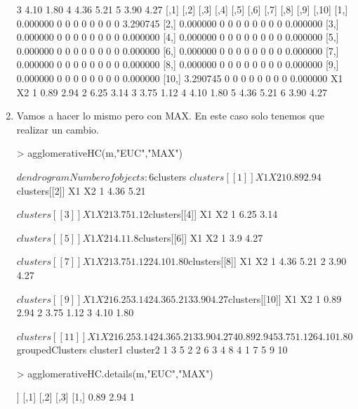 \documentclass[parskip=full]{scrartcl}
\begin{document}
\begin{enumerate}
\begin{Schunk}
\begin{Soutput}
3 4.10 1.80
4 4.36 5.21
5 3.90 4.27
          [,1] [,2] [,3] [,4] [,5] [,6] [,7] [,8] [,9]    [,10]
 [1,] 0.000000    0    0    0    0    0    0    0    0 3.290745
 [2,] 0.000000    0    0    0    0    0    0    0    0 0.000000
 [3,] 0.000000    0    0    0    0    0    0    0    0 0.000000
 [4,] 0.000000    0    0    0    0    0    0    0    0 0.000000
 [5,] 0.000000    0    0    0    0    0    0    0    0 0.000000
 [6,] 0.000000    0    0    0    0    0    0    0    0 0.000000
 [7,] 0.000000    0    0    0    0    0    0    0    0 0.000000
 [8,] 0.000000    0    0    0    0    0    0    0    0 0.000000
 [9,] 0.000000    0    0    0    0    0    0    0    0 0.000000
[10,] 3.290745    0    0    0    0    0    0    0    0 0.000000
    X1   X2
1 0.89 2.94
2 6.25 3.14
3 3.75 1.12
4 4.10 1.80
5 4.36 5.21
6 3.90 4.27
\end{Soutput}
\end{Schunk}


    \item Vamos a hacer lo mismo pero con MAX. En este caso solo tenemos que realizar un cambio.


\begin{Schunk}
\begin{Sinput}
> agglomerativeHC(m,"EUC","MAX")
\end{Sinput}
\begin{Soutput}
$dendrogram
Number of objects: 6 


$clusters
$clusters[[1]]
    X1   X2
1 0.89 2.94

$clusters[[2]]
    X1   X2
1 4.36 5.21

$clusters[[3]]
    X1   X2
1 3.75 1.12

$clusters[[4]]
    X1   X2
1 6.25 3.14

$clusters[[5]]
   X1  X2
1 4.1 1.8

$clusters[[6]]
   X1   X2
1 3.9 4.27

$clusters[[7]]
    X1   X2
1 3.75 1.12
2 4.10 1.80

$clusters[[8]]
    X1   X2
1 4.36 5.21
2 3.90 4.27

$clusters[[9]]
    X1   X2
1 6.25 3.14
2 4.36 5.21
3 3.90 4.27

$clusters[[10]]
    X1   X2
1 0.89 2.94
2 3.75 1.12
3 4.10 1.80

$clusters[[11]]
    X1   X2
1 6.25 3.14
2 4.36 5.21
3 3.90 4.27
4 0.89 2.94
5 3.75 1.12
6 4.10 1.80


$groupedClusters
  cluster1 cluster2
1        3        5
2        2        6
3        4        8
4        1        7
5        9       10
\end{Soutput}
\begin{Sinput}
> agglomerativeHC.details(m,"EUC","MAX")
\end{Sinput}
\begin{Soutput}
[[1]]
     [,1] [,2] [,3]
[1,] 0.89 2.94    1


\end{Soutput}
\end{Schunk}
\end{enumerate}
\end{document}
